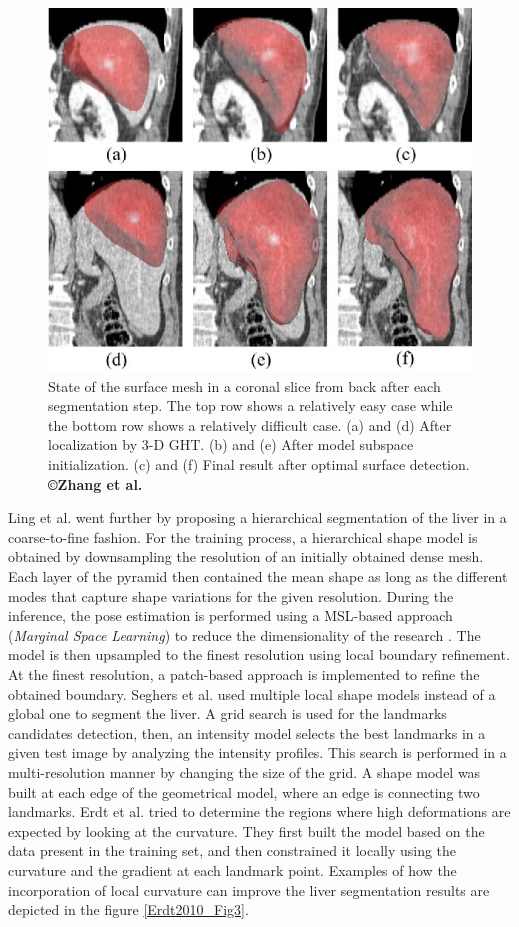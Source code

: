 \begin{figure}[th!]
	\centering
	\includegraphics[width=0.5\linewidth]{images/Zhang2010_fig5}
	\caption{State of the surface mesh in a coronal slice from back after each segmentation step. The top row shows a relatively easy case while the bottom row shows a relatively difficult case. (a) and (d) After localization by 3-D GHT. (b) and (e) After model subspace initialization. (c) and (f) Final result after optimal surface detection. \textbf{©Zhang et al. \cite{Zhang2010}}}
	\label{Zhang2010_Fig5}
\end{figure}


Ling et al. \cite{Ling2008} went further by proposing a hierarchical segmentation of
the liver in a coarse-to-fine fashion. For the training process, a
hierarchical shape model is obtained by downsampling the resolution of
an initially obtained dense mesh. Each layer of the pyramid then
contained the mean shape as long as the different modes that capture
shape variations for the given resolution. During the inference, the
pose estimation is performed using a MSL-based  approach (\emph{Marginal Space Learning}) to reduce the
dimensionality of the research \cite{Zheng2007}. The model is then upsampled to the
finest resolution using local boundary refinement. At the finest
resolution, a patch-based approach is implemented to refine the obtained
boundary.
Seghers et al. \cite{Seghers2007} used multiple local shape models instead of a global one to segment the liver.
A grid search is used for the landmarks candidates detection, then, an
intensity model selects the best landmarks in a given test image by
analyzing the intensity profiles. This search is performed in a
multi-resolution manner by changing the size of the grid. A shape model
was built at each edge of the geometrical model, where an edge is
connecting two landmarks.
Erdt et al. \cite{Erdt2010} tried to determine the regions where high deformations
are expected by looking at the curvature. They first built the model
based on the data present in the training set, and then constrained it
locally using the curvature and the gradient at each landmark point.
Examples of how the incorporation of local curvature can improve the liver
segmentation results are depicted in the figure \ref{Erdt2010_Fig3}.

